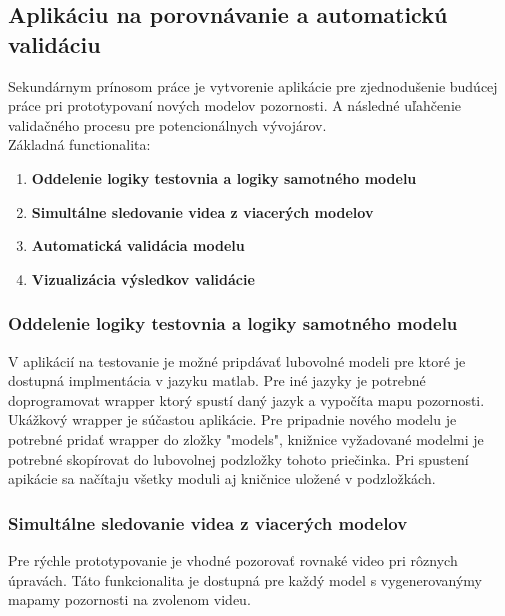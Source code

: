 \subsection{Aplikáciu na porovnávanie a automatickú validáciu}
Sekundárnym prínosom práce je vytvorenie aplikácie pre zjednodušenie budúcej práce pri prototypovaní nových modelov pozornosti.
A následné uľahčenie validačného procesu pre potencionálnych vývojárov.\\
Základná functionalita:
\begin{enumerate}
  \item\textbf{Oddelenie logiky testovnia a logiky samotného modelu}
  \item\textbf{Simultálne sledovanie videa z viacerých modelov}
  \item\textbf{Automatická validácia modelu}
  \item\textbf{Vizualizácia výsledkov validácie}
\end{enumerate}

\subsubsection{Oddelenie logiky testovnia a logiky samotného modelu}
V aplikácií na testovanie je možné pripdávať lubovolné modeli pre ktoré je dostupná implmentácia v jazyku matlab.
Pre iné jazyky je potrebné doprogramovat wrapper ktorý spustí daný jazyk a vypočíta mapu pozornosti.
Ukážkový wrapper je súčastou aplikácie.
Pre pripadnie nového modelu je potrebné pridať wrapper do zložky "models", knižnice vyžadované modelmi je potrebné skopírovat do lubovolnej podzložky tohoto priečinka.
Pri spustení apikácie sa načítaju všetky moduli aj kničnice uložené v podzložkách.

\subsubsection{Simultálne sledovanie videa z viacerých modelov}
Pre rýchle prototypovanie je vhodné pozorovať rovnaké video pri rôznych úpravách.
Táto funkcionalita je dostupná pre každý model s vygenerovanýmy mapamy pozornosti na zvolenom videu.

